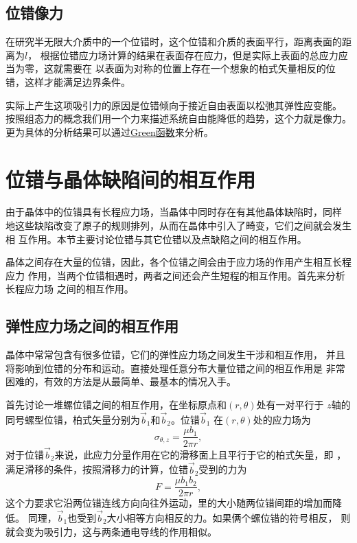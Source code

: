                 \subsection{位错像力}
                    在研究半无限大介质中的一个位错时，这个位错和介质的表面平行，距离表面的距离为$l$，
                    根据位错应力场计算的结果在表面存在应力，但是实际上表面的总应力应当为零，这就需要在
                    以表面为对称的位置上存在一个想象的柏式矢量相反的位错，这样才能满足边界条件。

                    实际上产生这项吸引力的原因是位错倾向于接近自由表面以松弛其弹性应变能。
                    按照组态力的概念我们用一个力来描述系统自由能降低的趋势，这个力就是像力。
                    更为具体的分析结果可以通过\href{https://brilliant.org/wiki/greens-functions-in-physics/}{Green函数}来分析。
        \section{位错与晶体缺陷间的相互作用}
            由于晶体中的位错具有长程应力场，当晶体中同时存在有其他晶体缺陷时，同样
            地这些缺陷改变了原子的规则排列，从而在晶体中引入了畸变，它们之间就会发生相
            互作用。本节主要讨论位错与其它位错以及点缺陷之间的相互作用。
            
            晶体之间存在大量的位错，因此，各个位错之间会由于应力场的作用产生相互长程应力
            作用，当两个位错相遇时，两者之间还会产生短程的相互作用。首先来分析长程应力场
            之间的相互作用。
            \subsection{弹性应力场之间的相互作用}
                    晶体中常常包含有很多位错，它们的弹性应力场之间发生干涉和相互作用，
                    并且将影响到位错的分布和运动。直接处理任意分布大量位错之间的相互作用是
                    非常困难的，有效的方法是从最简单、最基本的情况入手。

                    首先讨论一堆螺位错之间的相互作用，在坐标原点和$(r,\theta)$处有一对平行于
                    $z$轴的同号螺型位错，柏式矢量分别为$\vec{b}_1$和$\vec{b}_2$。位错$\vec{b}_1$
                    在$(r,\theta)$处的应力场为
                    \begin{equation}
                        \sigma_{\theta,z}=\frac{\mu b_1}{2\pi r},
                    \end{equation}
                    对于位错$\vec{b}_2$来说，此应力分量作用在它的滑移面上且平行于它的柏式矢量，即
                    ，满足滑移的条件，按照滑移力的计算，位错$\vec{b}_2$受到的力为
                    \begin{equation}
                        F=\frac{\mu b_1 b_2}{2\pi r}\label{两个螺型位错之间的作用力},    
                    \end{equation}
                    这个力要求它沿两位错连线方向向往外运动，里的大小随两位错间距的增加而降低。
                    同理，$\vec{b}_1$也受到$\vec{b}_2$大小相等方向相反的力。如果俩个螺位错的符号相反，
                    则就会变为吸引力，这与两条通电导线的作用相似。
                    
